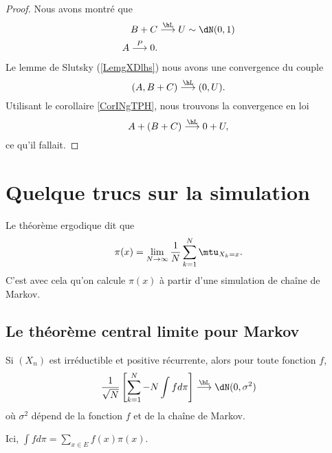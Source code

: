 \begin{proof}
    Nous avons montré que
    \begin{subequations}
        \begin{align}
            B+C&\stackrel{\hL}{\longrightarrow} U\sim\dN(0,1)\\
            A\stackrel{P}{\longrightarrow}0.
        \end{align}
    \end{subequations}
    Le lemme de Slutsky (\ref{LemgXDlhs}) nous avons une convergence du couple
    \begin{equation}
        (A,B+C)\stackrel{\hL}{\longrightarrow}(0,U).
    \end{equation}
    Utilisant le corollaire \ref{CorINgTPH}, nous trouvons la convergence en loi
    \begin{equation}
        A+(B+C)\stackrel{\hL}{\longrightarrow}0+U,
    \end{equation}
    ce qu'il fallait.
\end{proof}

\section{Quelque trucs sur la simulation}

Le théorème ergodique dit que
\begin{equation}
    \pi(x)=\lim_{N\to \infty} \frac{1}{ N }\sum_{k=1}^N\mtu_{X_k=x}.
\end{equation}
C'est avec cela qu'on calcule \( \pi(x)\) à partir d'une simulation de chaîne de Markov.

\subsection{Le théorème central limite pour Markov}

\begin{theorem}
    Si \( (X_n)\) est irréductible et positive récurrente, alors pour toute fonction \( f\),
    \begin{equation}
        \frac{1}{ \sqrt{N} }\left[ \sum_{k=1}^N-N\int fd\pi \right]\stackrel{\hL}{\longrightarrow}\dN(0,\sigma^2)
    \end{equation}
    où \( \sigma^2\) dépend de la fonction \( f\) et de la chaîne de Markov.

   Ici, \( \int fd\pi=\sum_{x\in E}f(x)\pi(x)\).
\end{theorem}

